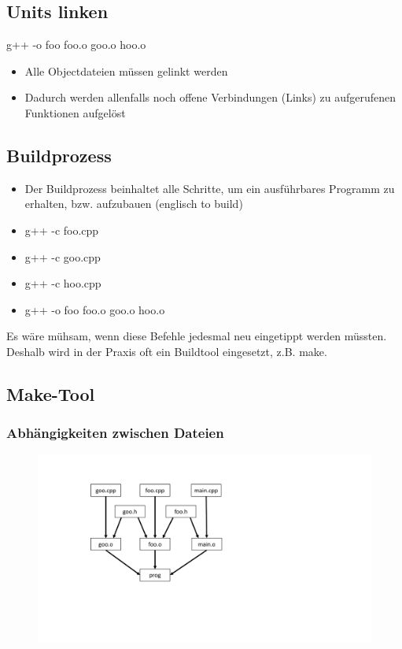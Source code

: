 \subsection{Units linken}
\label{sec:Units linken}
\begin{center}
	g++ -o foo foo.o goo.o hoo.o
\end{center}
\begin{itemize}
	\item Alle Objectdateien müssen gelinkt werden
	\item Dadurch werden allenfalls noch offene Verbindungen (Links) zu aufgerufenen Funktionen aufgelöst
\end{itemize}

\subsection{Buildprozess}
\label{sec:Buildprozess}
\begin{itemize}
	\item Der Buildprozess beinhaltet alle Schritte, um ein ausführbares Programm zu erhalten, bzw. aufzubauen (englisch to build)
	\item[\-] g++ -c foo.cpp
	\item[\-] g++ -c goo.cpp
	\item[\-] g++ -c hoo.cpp	
	\item[\-] g++ -o foo foo.o goo.o hoo.o
\end{itemize}
\begin{hinweis}
	Es wäre mühsam, wenn diese Befehle jedesmal neu eingetippt werden müssten. Deshalb wird in der Praxis oft ein Buildtool eingesetzt, z.B. make.
\end{hinweis}

\subsection{Make-Tool}
\label{sec:Makt-Tool}

\subsubsection{Abhängigkeiten zwischen Dateien}
\label{sec:Abhaengigkeiten zwischen Dateien}
\noindent
\begin{figure}[hh]
	\centering
	\includegraphics[width=0.5\linewidth]{images/make1.pdf}
\end{figure}

